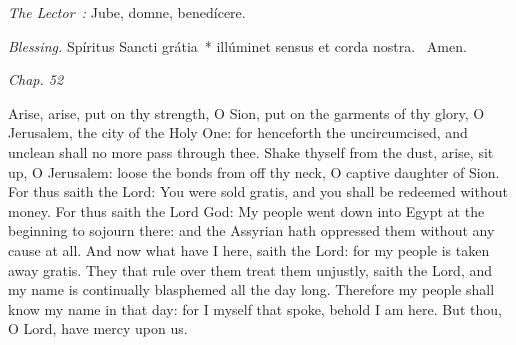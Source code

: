 {{  }

  {
    \medskip

    \emph{The Lector~:} Jube, domne, benedícere.

    \emph{Blessing.} Spíritus Sancti grátia~* illúminet sensus et corda nostra. \Rbar{}~Amen.
  }

  {
    \hspace{10ex}{Lesson III.}\hfill\emph{Chap. 52}\hspace{10ex}

    \begin{parcolumns}[rulebetween,colwidths={1=.51\linewidth}]{2}
    {Arise, arise, put on thy strength, O Sion, put on the garments of thy glory, O Jerusalem, the city of the Holy One: for henceforth the uncircumcised, and unclean shall no more pass through thee.
      Shake thyself from the dust, arise, sit up, O Jerusalem: loose the bonds from off thy neck, O captive daughter of Sion.
      For thus saith the Lord: You were sold gratis, and you shall be redeemed without money.
      For thus saith the Lord God: My people went down into Egypt at the beginning to sojourn there: and the Assyrian hath oppressed them without any cause at all.
      And now what have I here, saith the Lord: for my people is taken away gratis. They that rule over them treat them unjustly, saith the Lord, and my name is continually blasphemed all the day long.
      Therefore my people shall know my name in that day: for I myself that spoke, behold I am here.
      But thou, O Lord, have mercy upon us.}
    \end{parcolumns}

  }

  {
    \medskip
  }
}
